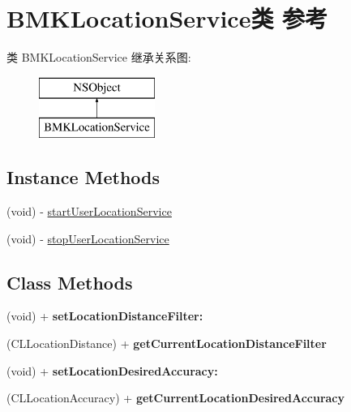 \hypertarget{interface_b_m_k_location_service}{}\section{B\+M\+K\+Location\+Service类 参考}
\label{interface_b_m_k_location_service}
类 B\+M\+K\+Location\+Service 继承关系图\+:\begin{figure}[H]
\begin{center}
\leavevmode
\includegraphics[height=2.000000cm]{interface_b_m_k_location_service}
\end{center}
\end{figure}
\subsection*{Instance Methods}
\begin{DoxyCompactItemize}
\item 
(void) -\/ \hyperlink{interface_b_m_k_location_service_a3b49abd4104d23a114b7a7a632ff3722}{start\+User\+Location\+Service}
\item 
(void) -\/ \hyperlink{interface_b_m_k_location_service_a1aece8fbe579debdd0984147e036e947}{stop\+User\+Location\+Service}
\end{DoxyCompactItemize}
\subsection*{Class Methods}
\begin{DoxyCompactItemize}
\item 
\hypertarget{interface_b_m_k_location_service_abc5a09b7684f33dba3b9863a8e279d9d}{}(void) + {\bfseries set\+Location\+Distance\+Filter\+:}\label{interface_b_m_k_location_service_abc5a09b7684f33dba3b9863a8e279d9d}

\item 
\hypertarget{interface_b_m_k_location_service_a7bedc55fa842dc67e5e6e332de2f934e}{}(C\+L\+Location\+Distance) + {\bfseries get\+Current\+Location\+Distance\+Filter}\label{interface_b_m_k_location_service_a7bedc55fa842dc67e5e6e332de2f934e}

\item 
\hypertarget{interface_b_m_k_location_service_aab4e97f6d6d047ef81895a3acff0f5b4}{}(void) + {\bfseries set\+Location\+Desired\+Accuracy\+:}\label{interface_b_m_k_location_service_aab4e97f6d6d047ef81895a3acff0f5b4}

\item 
\hypertarget{interface_b_m_k_location_service_a3b0b3c85476716fbbea4a535e38e038c}{}(C\+L\+Location\+Accuracy) + {\bfseries get\+Current\+Location\+Desired\+Accuracy}\label{interface_b_m_k_location_service_a3b0b3c85476716fbbea4a535e38e038c}

\end{DoxyCompactItemize}
